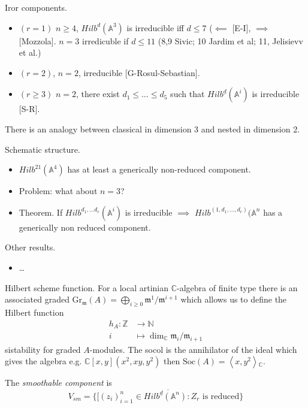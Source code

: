 Iror components.
\begin{itemize}
\item $(r=1)$ $n\geq 4$,
$Hilb^d(\mathbb{A}^3)$
is irreducible iff $d\leq 7$ ($\impliedby$
[E-I], $\implies $ [Mozzola].
$n=3$ irredicuble if $d \leq  11$ (8,9 Sivic;
10 Jardim et al; 11, Jelisievv et
al.)
\item $(r=2)$, $n=2$, irreducible
[G-Rosul-Sebastian].
\item $(r \geq 3)$ $n=2$, there exist $d_1
\leq \ldots \leq d_5$
such that
$Hilb^{\underline{d}}(\mathbb{A}^i)$ is
irreducible [S-R].
\end{itemize}

There is an analogy between classical in
dimension 3
and nested in dimension 2.

Schematic structure.
\begin{itemize}
\item [I] $Hilb^{21}(\mathbb{A}^4)$ has at
least a generically
non-reduced component.
\item Problem: what about $n=3$?
\item Theorem. If $Hilb^{d_1,\ldots
d_r}(\mathbb{A}^i)$ is
irreducible $\implies $
$Hilb^{(1,d_1,\ldots,d_r)}(\mathbb{A}^n$
has a generically non reduced component.
\end{itemize}

Other results.
\begin{itemize}
\item …
\end{itemize}
Hilbert scheme function.
For a local artinian $\mathbb{C}$-algebra of
finite type there is an associated graded
$\text{Gr}_\mathfrak{m}(A)
=\bigoplus_{i \geq
0}\mathfrak{m}^1/\mathfrak{m}^{i+1}$
which allows us to define the Hilbert
function
$$
\begin{aligned}
h_A: \mathbb{Z} &\longrightarrow \mathbb{N}
\\
i &\longmapsto \dim_\mathbb{C}
\mathfrak{m}_i/\mathfrak{m}_{i+1}
\end{aligned}
$$
sistability for graded $A$-modules.
The socol is the annihilator of
the ideal which gives the algebra
e.g. $\mathbb{C}[x,y](x^2,xy,y^2)$ then
$\text{Soc}(A)=\left\langle{}x,y^2\right\rangle{}_\mathbb{C}
$.

\medskip\noindent
\begin{definition}
\label{definition-smoothable-component}
The {\it smoothable component} is
 $$
V_{sm}=\overline{\{[(z_i)_{i=1}^n \in
Hilb^{\underline{d}}(\mathbb{A}^n):
Z_r\text{ is reduced}\}}
$$
\end{definition}

